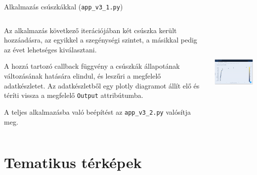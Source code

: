 \documentclass[english, aspectratio=169]{beamer}
\makeatletter
\let\origtableofcontents=\tableofcontents
\def\tableofcontents{\@ifnextchar[{\origtableofcontents}{\gobbletableofcontents}}
\def\gobbletableofcontents#1{\origtableofcontents}
\makeatother
\begin{document}
\begin{frame}{Alkalmazás csúszkákkal (\texttt{app\_v3\_1.py})}
	\begin{columns}
		\begin{column}{.5\textwidth}
			Az alkalmazás következő iterációjában két csúszka került hozzáadásra, az egyikkel a szegénységi szintet, a másikkal pedig az évet lehetséges kiválasztani.\par\medskip
			A hozzá tartozó callback függvény a csúszkák állapotának változásának hatására elindul, és leszűri a megfelelő adatkészletet. Az adatkészletből egy plotly diagramot állít elő és téríti vissza a megfelelő \texttt{Output} attribútumba.\par\medskip
			A teljes alkalmazásba való beépítést az \texttt{app\_v3\_2.py} valósítja meg.
		\end{column}
		\begin{column}{.5\textwidth}
			\begin{center}
				\includegraphics[width=7cm, height=5cm]{images/scatter_19.png}
			\end{center}		
		\end{column}
	\end{columns}
\end{frame}

\section{Tematikus térképek}

\begin{frame}{}
	\tableofcontents[currentsection]
\end{frame}
\end{document}
